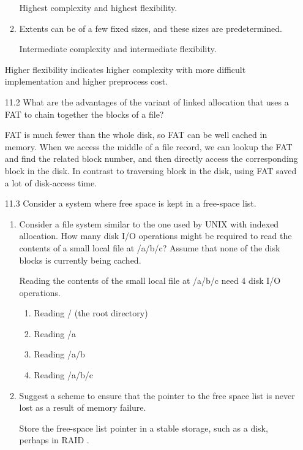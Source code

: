\begin{enumerate}
\begin{enumerate}
        Highest complexity and highest flexibility.
        
        \item Extents can be of a few fixed sizes, and these sizes are predetermined.
        
        Intermediate complexity and intermediate flexibility.
    \end{enumerate}
    
    Higher flexibility indicates higher complexity with more difficult implementation and higher preprocess cost.

    \item [11.2] What are the advantages of the variant of linked allocation that uses a FAT to chain together the blocks of a file?
    
    FAT is much fewer than the whole disk, so FAT can be well cached in memory. When we access the middle of a file record, we can lookup the FAT and find the related block number, and then directly access the corresponding block in the disk. In contrast to traversing block in the disk, using FAT saved a lot of disk-access time.

    \item [11.3] Consider a system where free space is kept in a free-space list.
    
    \begin{enumerate}
        \item Consider a file system similar to the one used by UNIX with indexed allocation. How many disk I/O operations might be required to read the contents of a small local file at /a/b/c? Assume that none of the disk blocks is currently being cached.
        
        Reading the contents of the small local file at /a/b/c need 4 disk I/O operations.
        
        \begin{enumerate}
            \item Reading / (the root directory)
            \item Reading /a
            \item Reading /a/b
            \item Reading /a/b/c
        \end{enumerate}
        
        \item Suggest a scheme to ensure that the pointer to the free space list is never lost as a result of memory failure.
        
        Store the free-space list pointer in a stable storage, such as a disk, perhaps in RAID \footnotemark.
        
        
    \end{enumerate}
\end{enumerate}


